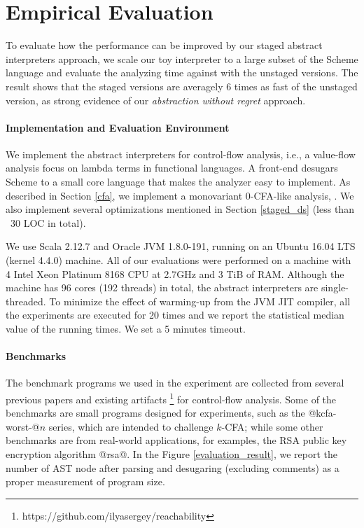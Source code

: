 \section{Empirical Evaluation} \label{evaluation}

To evaluate how the performance can be improved by our staged abstract interpreters
approach, we scale our toy interpreter to a large subset of the Scheme language
and evaluate the analyzing time against with the unstaged versions. The result
shows that the staged versions are averagely 6 times as fast of the unstaged
version, as strong evidence of our \textit{abstraction without regret}
approach.

\paragraph{Implementation and Evaluation Environment}
We implement the abstract interpreters for control-flow analysis, i.e., a
value-flow analysis focus on lambda terms in functional languages. A front-end
desugars Scheme to a small core language that makes the analyzer easy to
implement. As described in Section \ref{cfa}, we implement a monovariant
0-CFA-like analysis, . We also implement several
optimizations mentioned in Section \ref{staged_ds} (less than ~30 LOC in total).

We use Scala 2.12.7 and Oracle JVM 1.8.0-191, running on an Ubuntu 16.04 LTS
(kernel 4.4.0) machine. All of our evaluations were performed on a machine with 4 Intel
Xeon Platinum 8168 CPU at 2.7GHz and 3 TiB of RAM. Although the machine has 96
cores (192 threads) in total, the abstract interpreters are single-threaded.
To minimize the effect of warming-up from the JVM JIT compiler, all the
experiments are executed for 20 times and we report the statistical median value
of the running times. We set a 5 minutes timeout.

\paragraph{Benchmarks}
The benchmark programs we used in the experiment are collected from several
previous papers \cite{Johnson:2013:OAA:2500365.2500604, ashley:practical,
DBLP:journals/corr/abs-1102-3676} and existing artifacts
\footnote{https://github.com/ilyasergey/reachability} for control-flow analysis.
Some of the benchmarks are small programs designed for experiments, such as the
@kcfa-worst-@$n$ series, which are intended to challenge $k$-CFA; while some
other benchmarks are from real-world applications, for examples, the RSA public
key encryption algorithm @rsa@. In the Figure \ref{evaluation_result}, we report
the number of AST node after parsing and desugaring (excluding comments) as a
proper measurement of program size.

